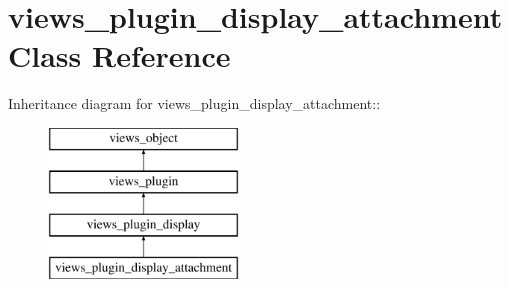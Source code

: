 \hypertarget{classviews__plugin__display__attachment}{
\section{views\_\-plugin\_\-display\_\-attachment Class Reference}
\label{classviews__plugin__display__attachment}
}
Inheritance diagram for views\_\-plugin\_\-display\_\-attachment::\begin{figure}[H]
\begin{center}
\leavevmode
\includegraphics[height=4cm]{classviews__plugin__display__attachment}
\end{center}
\end{figure}
